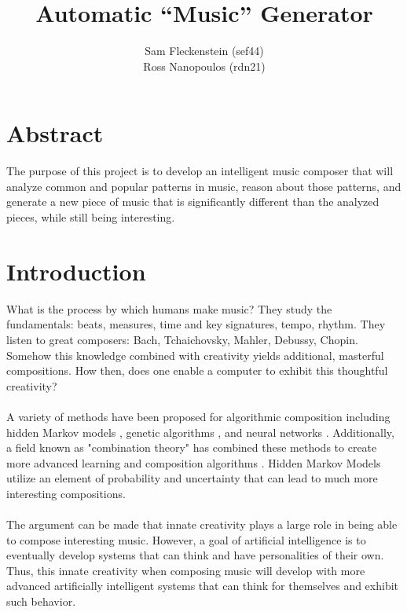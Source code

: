 \documentclass{article}
\begin{document}
\clearpage
{}
\begin{center}
\begin{minipage}{.6\textwidth}

\title{Automatic ``Music'' Generator \\ \vspace{2 pt} }
\author{Sam Fleckenstein (sef44) \\ Ross Nanopoulos (rdn21)}
\maketitle

\end{minipage}
\end{center}
\clearpage

\tableofcontents
\newpage

\section{Abstract}
The purpose of this project is to develop an intelligent music composer that will analyze common and popular patterns in music, reason about those patterns, and generate a new piece of music that is significantly different than the analyzed pieces, while still being interesting.

\newpage

\section{Introduction}
What is the process by which humans make music? They study the fundamentals: beats, measures, time and key signatures, tempo, rhythm. They listen to great composers: Bach, Tchaichovsky, Mahler, Debussy, Chopin. Somehow this knowledge combined with creativity yields additional, masterful compositions. How then, does one enable a computer to exhibit this thoughtful creativity?\\
 \\
 A variety of methods have been proposed for algorithmic composition including hidden Markov models \cite{5492670}, genetic algorithms \cite{514161}, and neural networks \cite{4667040}. Additionally, a field known as "combination theory" has combined these methods to create more advanced learning and composition algorithms \cite{4626654}. Hidden Markov Models utilize an element of probability and uncertainty that can lead to much more interesting compositions.\\
\\
The argument can be made that innate creativity plays a large role in being able to compose interesting music. However, a goal of artificial intelligence is to eventually develop systems that can think and have personalities of their own. Thus, this innate creativity when composing music will develop with more advanced artificially intelligent systems that can think for themselves and exhibit such behavior.\\
\end{document}
